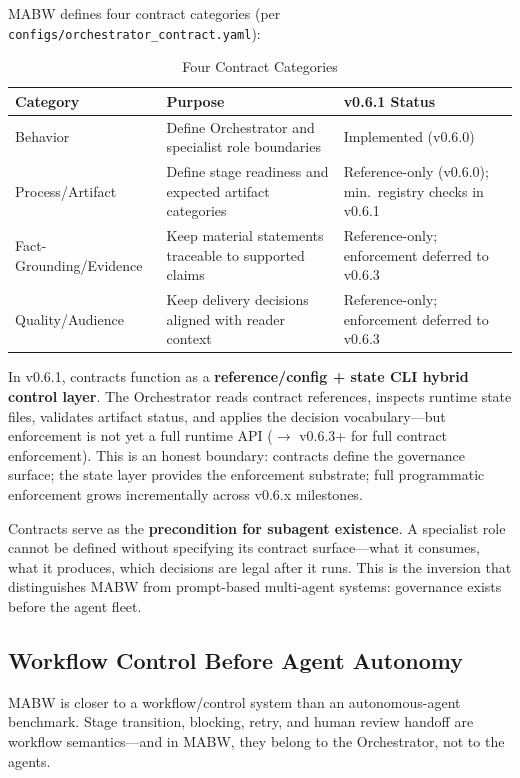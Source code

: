 \documentclass[11pt,a4paper]{article}
\begin{document}
MABW defines four contract categories (per \texttt{configs/orchestrator\_contract.yaml}):

\begin{table}[ht]
\centering
\caption{Four Contract Categories}
\label{tab:contracts}
\begin{tabular}{@{}p{3.2cm}p{5.5cm}p{4.5cm}@{}}
\toprule
\textbf{Category} & \textbf{Purpose} & \textbf{v0.6.1 Status} \\
\midrule
Behavior & Define Orchestrator and specialist role boundaries & Implemented (v0.6.0) \\
Process/Artifact & Define stage readiness and expected artifact categories & Reference-only (v0.6.0); min.~registry checks in v0.6.1 \\
Fact-Grounding/Evidence & Keep material statements traceable to supported claims & Reference-only; enforcement deferred to v0.6.3 \\
Quality/Audience & Keep delivery decisions aligned with reader context & Reference-only; enforcement deferred to v0.6.3 \\
\bottomrule
\end{tabular}
\end{table}

In v0.6.1, contracts function as a \textbf{reference/config + state CLI hybrid control layer}. The Orchestrator reads contract references, inspects runtime state files, validates artifact status, and applies the decision vocabulary---but enforcement is not yet a full runtime API ($\rightarrow$ v0.6.3+ for full contract enforcement). This is an honest boundary: contracts define the governance surface; the state layer provides the enforcement substrate; full programmatic enforcement grows incrementally across v0.6.x milestones.

Contracts serve as the \textbf{precondition for subagent existence}. A specialist role cannot be defined without specifying its contract surface---what it consumes, what it produces, which decisions are legal after it runs. This is the inversion that distinguishes MABW from prompt-based multi-agent systems: governance exists before the agent fleet.

\subsection{Workflow Control Before Agent Autonomy}

MABW is closer to a workflow/control system than an autonomous-agent benchmark. Stage transition, blocking, retry, and human review handoff are workflow semantics---and in MABW, they belong to the Orchestrator, not to the agents.
\end{document}
